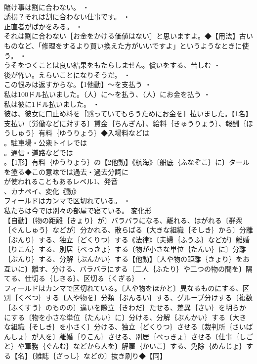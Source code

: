 \documentclass[8pt]{extreport}
\begin{document}
\begin{CJK}{UTF8}{min}
\\	賭け事は割に合わない。 ・
\\	誘拐？それは割に合わない仕事です。 ・
\\	正直者がばかをみる。 ・
\\	それは割に合わない［お金をかける価値はない］と思いますよ。◆【用法】古いものなど、「修理をするより買い換えた方がいいですよ」というようなときに使う。 ・
\\	うそをつくことは良い結果をもたらしません。償いをする、苦しむ ・
\\	後が怖い。えらいことになりそうだ。 ・
\\	この恨みは返すからな。【1他動】～を支払う ・
\\	私は100ドル払いました。（人）に～を払う、（人）にお金を払う ・
\\	私は彼に1ドル払いました。 ・
\\	彼は、彼女に口止め料を［黙っていてもらうためにお金を］払いました。【1名】支払い〔労働などに対する〕賃金｛ちんぎん｝、給料｛きゅうりょう｝、報酬｛ほうしゅう｝有料｛ゆうりょう｝◆入場料などは
\\	。駐車場・公衆トイレでは
\\	。通信・道路などでは
\\	。【1形】有料｛ゆうりょう｝の【2他動】《航海》〔船底｛ふなぞこ｝に〕タールを塗る◆この意味では過去・過去分詞に
\\	が使われることもあるレベル1、発音
\\	、カナペイ、変化《動》
\\	フィールドはカンマで区切れている。 ・
\\	私たちは今では別々の部屋で寝ている。	変化形 
\\	【自動】〔物の距離｛きょり｝が〕バラバラになる、離れる、はがれる〔群衆｛ぐんしゅう｝などが〕分かれる、散らばる〔大きな組織｛そしき｝から〕分離｛ぶんり｝する、独立｛どくりつ｝する《法律》〔夫婦｛ふうふ｝などが〕離婚｛りこん｝する、別居｛べっきょ｝する〔物が小さな単位｛たんい｝に〕分離｛ぶんり｝する、分解｛ぶんかい｝する【他動】〔人や物の距離｛きょり｝をお互いに〕離す、分ける、バラバラにする〔二人｛ふたり｝や二つの物の間を〕隔てる、仕切る｛しきる｝、区切る｛くぎる｝ ・
\\	フィールドはカンマで区切れている。〔人や物をほかと〕異なるものにする、区別｛くべつ｝する〔人や物を〕分類｛ぶんるい｝する、グループ分けする〔複数｛ふくすう｝のものの〕違いを際立｛きわだ｝たせる、差異｛さい｝を明らかにする〔物を小さな単位｛たんい｝に〕分ける、分解｛ぶんかい｝する〔大きな組織｛そしき｝を小さく〕分ける、独立｛どくりつ｝させる〔裁判所｛さいばんしょ｝が人を〕離婚｛りこん｝させる、別居｛べっきょ｝させる〔仕事｛しごと｝や軍務｛ぐんむ｝などから人を〕解雇｛かいこ｝する、免除｛めんじょ｝する【名】〔雑誌｛ざっし｝などの〕抜き刷り◆【同】

\end{CJK}
\end{document}
